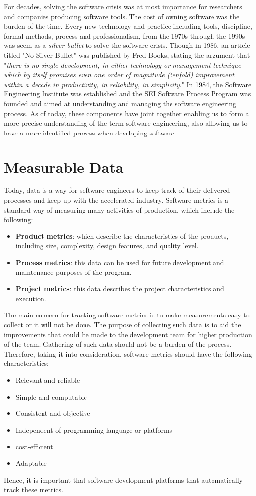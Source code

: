 \documentclass[a4paper]{article}
\begin{document}
{\bigbreak
For decades, solving the software crisis was at most importance for researchers and companies producing software tools. The cost of owning software was the burden of the time.
\bigbreak
Every new technology and practice including tools, discipline, formal methods, process and professionalism, from the 1970s through the 1990s was seem as a \textit{silver bullet} to solve the software crisis. Though in 1986, an article titled "No Silver Bullet" was published by Fred Books, stating the argument that "\textit{there is no single development, in either technology or management technique which by itself promises even one order of magnitude (tenfold) improvement within a decade in productivity, in reliability, in simplicity}."\autocite{R07}
\bigbreak
In 1984, the Software Engineering Institute was established and the SEI Software Process Program was founded and aimed at understanding and managing the software engineering process.
\bigbreak
As of today, these components have joint together enabling us to form a more precise understanding of the term software engineering, also allowing us to have a more identified process when developing software.

\section{Measurable Data}
Today, data is a way for software engineers to keep track of their delivered processes and keep up with the accelerated industry. Software metrics is a standard way of measuring many activities of production, which include the following:
\begin{itemize}
    \item \textbf{Product metrics}: which describe the characteristics of the products, including size, complexity, design features, and quality level.
    \item \textbf{Process metrics}: this data can be used for future development and maintenance purposes of the program.
    \item \textbf{Project metrics}: this data describes the project characteristics and execution.\autocite{R04}
\end{itemize}
\bigbreak
The main concern for tracking software metrics is to make measurements easy to collect or it will not be done. The purpose of collecting such data is to aid the improvements that could be made to the development team for higher production of the team. Gathering of such data should not be a burden of the process. Therefore, taking it into consideration, software metrics should have the following characteristics:
\begin{itemize}
    \item Relevant and reliable
    \item Simple and computable
    \item Consistent and objective
    \item Independent of programming language or platforms
    \item cost-efficient
    \item Adaptable\autocite{R08}
\end{itemize}
\bigbreak
Hence, it is important that software development platforms that automatically track these metrics.
\bigbreak
}
\end{document}
